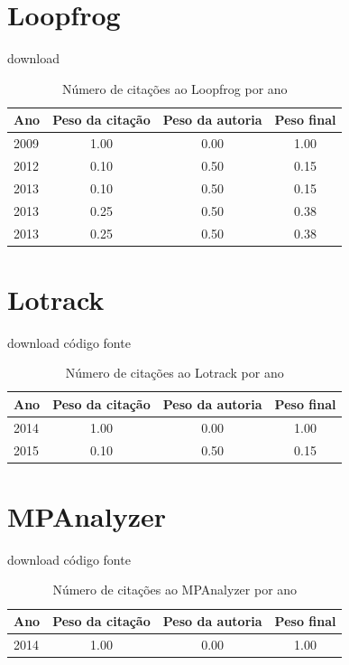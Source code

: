 \section{Loopfrog}
\checkmark download
\begin{table}[H]
\caption{Número de citações ao Loopfrog por ano}
\centering
\begin{tabular}{| l | c | c | c |}
  \hline
  Ano & Peso da citação & Peso da autoria & Peso final \\
  \hline
  2009
    & 1.00
    & 0.00
    & {\color{blue} 1.00} \\
\hline
  2012
    & 0.10
    & 0.50
    & {\color{red} 0.15} \\
\hline
  2013
    & 0.10
    & 0.50
    & {\color{red} 0.15} \\
  2013
    & 0.25
    & 0.50
    & {\color{red} 0.38} \\
  2013
    & 0.25
    & 0.50
    & {\color{red} 0.38} \\
\hline
\end{tabular}
\end{table}
\section{Lotrack}
\checkmark download
\checkmark código fonte
\begin{table}[H]
\caption{Número de citações ao Lotrack por ano}
\centering
\begin{tabular}{| l | c | c | c |}
  \hline
  Ano & Peso da citação & Peso da autoria & Peso final \\
  \hline
  2014
    & 1.00
    & 0.00
    & {\color{blue} 1.00} \\
\hline
  2015
    & 0.10
    & 0.50
    & {\color{red} 0.15} \\
\hline
\end{tabular}
\end{table}
\section{MPAnalyzer}
\checkmark download
\checkmark código fonte
\begin{table}[H]
\caption{Número de citações ao MPAnalyzer por ano}
\centering
\begin{tabular}{| l | c | c | c |}
  \hline
  Ano & Peso da citação & Peso da autoria & Peso final \\
  \hline
  2014
    & 1.00
    & 0.00
    & {\color{blue} 1.00} \\
\hline
\end{tabular}
\end{table}
